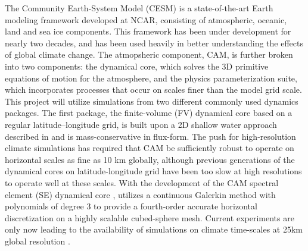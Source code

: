 \documentclass[11pt]{article}
\begin{document}
The Community Earth-System Model (CESM) \cite{RBNetal2010NCAR} is a state-of-the-art Earth modeling framework developed at NCAR, consisting of atmospheric, oceanic, land and sea ice components.  This framework has been under development for nearly two decades, and has been used heavily in better understanding the effects of global climate change.  The atmopsheric component, CAM, is further broken into two components: the dynamical core, which solves the 3D primitive equations of motion for the atmosphere, and the physics parameterization suite, which incorporates processes that occur on scales finer than the model grid scale. This project will utilize simulations from two different commonly used dynamics packages. The first package, the finite-volume (FV) dynamical core based on a regular latitude--longitude grid, is built upon a 2D shallow water approach described in \citet{Lin1996,Lin1997} and is mass-conservative in flux-form. The push for high-resolution climate simulations has required that CAM be sufficiently robust to operate on horizontal scales as fine as 10 km globally, although previous generations of the dynamical cores on latitude-longitude grid have been too slow at high resolutions to operate well at these scales.  With the development of the CAM spectral element (SE) dynamical core \citep{dennis2012cam}, utilizes a continuous Galerkin method with polynomials of degree 3 to provide a fourth-order accurate horizontal discretization on a highly scalable cubed-sphere mesh.  Current experiments are only now leading to the availability of simulations on climate time-scales at 25km global resolution \citep{Bacmeister2014, Wehner2014, Wehner2015}.


\end{document}
